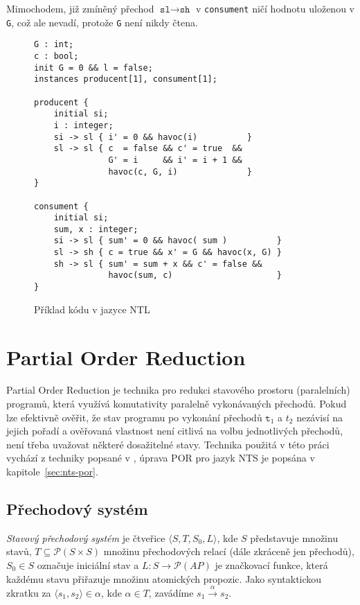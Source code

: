 \documentclass[12pt]{fithesis2}
\newcommand{\tuple}[1]{\langle #1 \rangle}
\begin{document}
Mimochodem, již zmíněný přechod $\texttt{sl} \rightarrow \texttt{sh}$ v \texttt{consument} ničí hodnotu uloženou v \texttt{G}, což ale nevadí, protože \texttt{G} není nikdy čtena.

\begin{figure}[t]
\begin{lstlisting}
G : int;
c : bool;
init G = 0 && l = false;
instances producent[1], consument[1];

producent {
    initial si;
    i : integer;
    si -> sl { i' = 0 && havoc(i)          }
    sl -> sl { c  = false && c' = true  &&
               G' = i     && i' = i + 1 &&
               havoc(c, G, i)              }
}

consument {
	initial si;
	sum, x : integer;
	si -> sl { sum' = 0 && havoc( sum )          }
	sl -> sh { c = true && x' = G && havoc(x, G) }
	sh -> sl { sum' = sum + x && c' = false &&
	           havoc(sum, c)                     }
}

\end{lstlisting}
\caption{Příklad kódu v jazyce NTL}
\label{fig:nts-prodcons}
\end{figure}

\section{Partial Order Reduction}
\label{sec:POR}
Partial Order Reduction je technika pro redukci stavového prostoru (paralelních) programů, která využívá komutativity paralelně vykonávaných přechodů. Pokud lze efektivně ověřit, že stav programu po vykonání přechodů $\texttt{t}_1$ a $t_2$ nezávisí na jejich pořadí a ověřovaná vlastnost není citlivá na volbu jednotlivých přechodů, není třeba uvažovat některé dosažitelné stavy. Technika použitá v této práci vychází z techniky popsané v \cite{CLARKE}, úprava POR pro jazyk NTS je popsána v kapitole~\ref{sec:nts-por}.

\subsection{Přechodový systém}
\textit{Stavový přechodový systém} je čtveřice $\tuple{S, T, S_0, L}$, kde $S$ představuje množinu stavů, $T \subseteq \mathcal{P}\left({S \times S}\right)$ množinu přechodových relací (dále zkráceně jen přechodů), $S_0 \in S$ označuje iniciální stav a $L : S \rightarrow \mathcal{P}\left({\mathit{AP}}\right)$ je značkovací funkce, která každému stavu přiřazuje množinu atomických propozic. Jako syntaktickou zkratku za $\tuple{s_1, s_2} \in \alpha$, kde $\alpha \in T$, zavádíme $s_1 \xrightarrow{\alpha} s_2$.
\end{document}
